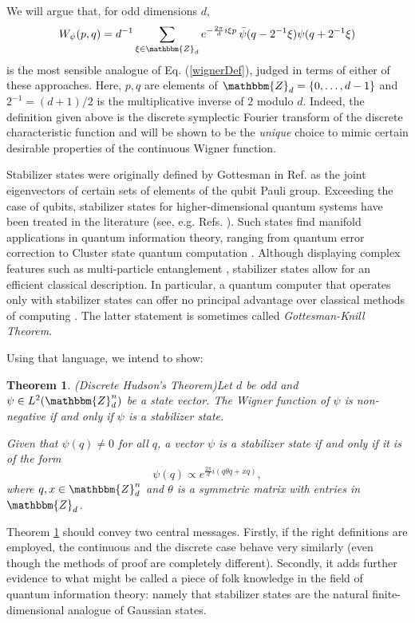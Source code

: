 \documentclass[aps,twocolumn,floatfix]{revtex4}
\newtheorem{theorem}{Theorem}
\def\ZZ{\mathbbm{Z}}
\begin{document}
We will argue that, for odd dimensions $d$, 
\begin{equation*}
	W_\psi(p,q) = d^{-1} \sum_{\xi\in \ZZ_d} e^{-\frac{2\pi}d i\xi p}\, 
	\bar\psi(q-2^{-1} \xi)\psi(q+2^{-1} \xi)
\end{equation*}
is the most sensible analogue of Eq.  (\ref{wignerDef}), judged in
terms of either of these approaches.  Here, $p,q$ are elements of
$\ZZ_d=\{0,\dots,d-1\}$ and $2^{-1}=(d+1)/2$ is the multiplicative
inverse of $2$ modulo $d$. Indeed, the definition given above is the
discrete symplectic Fourier transform of the discrete characteristic
function and will be shown to be the \emph{unique} choice to mimic
certain desirable properties of the continuous Wigner function.

Stabilizer states were originally defined by Gottesman in Ref.
\cite{gottesman} as the joint eigenvectors of certain sets of elements
of the qubit Pauli group.  Exceeding the case of qubits, stabilizer
states for higher-dimensional quantum systems have been treated in the
literature (see, e.g. Refs. \cite{knill,schlinge,grassl,erik}).  Such
states find manifold applications in quantum information theory,
ranging from quantum error correction \cite{nielsen} to Cluster state
quantum computation \cite{raussendorf}.  Although displaying complex
features such as multi-particle entanglement \cite{jensGraph},
stabilizer states allow for an efficient classical description. In
particular, a quantum computer that operates only with stabilizer
states can offer no principal advantage over classical methods of computing
\cite{nielsen}. The latter statement is sometimes called
\emph{Gottesman-Knill Theorem}.

Using that language, we intend to show:

\begin{theorem} \emph{(Discrete Hudson's Theorem)}\label{thMain}
	Let $d$ be odd and $\psi\in L^2(\ZZ_d^n)$ be a state vector.  The
	Wigner function of $\psi$ is non-negative if and only if $\psi$ is a
	\emph{stabilizer state}.

	Given that $\psi(q)\neq0$ for all $q$, a vector $\psi$ is a
	stabilizer state if and only if it is of the form
	\begin{equation*}
		\psi(q)\propto e^{\frac{2\pi}{d} i (q \theta q+x q)},
	\end{equation*}
	where $q,x\in\ZZ_d^n$ and $\theta$ is a symmetric matrix with entries in
	$\ZZ_d$.
\end{theorem}

Theorem \ref{thMain} should convey two central messages.  Firstly, if
the right definitions are employed, the continuous and the discrete
case behave very similarly (even though the methods of proof are
completely different). Secondly, it adds further evidence to what
might be called a piece of folk knowledge in the field of quantum
information theory: namely that stabilizer states are the natural
finite-dimensional analogue of Gaussian states.
\end{document}
